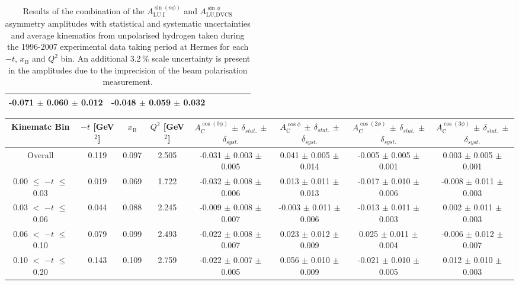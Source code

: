 \begin{table}[width=15cm]
\begin{center}
{\begin{tabular}{|c|c|c|c|c|c|c|}
-0.071  $\pm$  0.060 $\pm$ 0.012 & -0.048  $\pm$  0.059  $\pm$  0.032\\
\hline
  \end{tabular}
}
 \end{center}
\caption{Results of the combination of the $A_{\textrm{LU,I}}^{\sin(n\phi)}$ and $A_{\textrm{LU,DVCS}}^{\sin \phi}$ asymmetry amplitudes with statistical and systematic uncertainties and average kinematics from unpolarised hydrogen taken during
the 1996-2007 experimental data taking period at H{\sc ermes} for each $-t$, $x_{\textrm{B}}$ and $Q^{2}$ bin.
An additional 3.2\,\% scale uncertainty is present in the amplitudes due to the imprecision of
the beam polarisation measurement.
}
\end{table}


\begin{table}[width=15cm]
 \begin{center}
\resizebox{16cm}{!} {
  \begin{tabular}{|c|c|c|c|c|c|c|c|}
\hline
Kinematc Bin &  $-t$ [GeV$^{2}$] & $x_{\textrm{B}}$ & $Q^{2}$ [GeV$^{2}$] & 
$A_{\textrm{C}}^{\cos(0\phi)}$ $\pm$ $\delta_{stat.}$ $\pm$ $\delta_{syst.}$ & $A_{\textrm{C}}^{\cos\phi}$ $\pm$ $\delta_{stat.}$ $\pm$ $\delta_{syst.}$
& $A_{\textrm{C}}^{\cos(2\phi)}$ $\pm$ $\delta_{stat.}$ $\pm$ $\delta_{syst.}$ & $A_{\textrm{C}}^{\cos(3\phi)}$ $\pm$ $\delta_{stat.}$ $\pm$ $\delta_{syst.}$ \\
\hline
\hline
Overall &  0.119 & 0.097 &  2.505 &  -0.031 $\pm$  0.003 $\pm$  0.005 & 
0.041  $\pm$  0.005 $\pm$   0.014 &  -0.005  $\pm$  0.005  $\pm$   0.001 &  0.003  $\pm$   0.005   $\pm$   0.001 \\
\hline
0.00 $\leqslant$ $-t$ $\leqslant$ 0.03 &  0.019 & 0.069 & 1.722  &  -0.032  $\pm$  0.008 $\pm$ 0.006 & 
0.013  $\pm$  0.011  $\pm$   0.013 &  -0.017  $\pm$  0.010 $\pm$  0.006 &  -0.008   $\pm$  0.011   $\pm$   0.003\\
0.03 $<$ $-t$ $\leqslant$ 0.06 &  0.044 & 0.088 & 2.245 & -0.009  $\pm$  0.008  $\pm$   0.007 &
 -0.003 $\pm$  0.011  $\pm$   0.006 &  -0.013  $\pm$  0.011  $\pm$  0.003 &  0.002   $\pm$  0.011   $\pm$   0.003\\
0.06 $<$ $-t$ $\leqslant$ 0.10 & 0.079  & 0.099 &  2.493 & -0.022  $\pm$  0.008  $\pm$  0.007 & 
0.023 $\pm$  0.012  $\pm$   0.009 & 0.025  $\pm$  0.011 $\pm$   0.004 &  -0.006   $\pm$  0.012  $\pm$    0.007\\
0.10 $<$ $-t$ $\leqslant$ 0.20 & 0.143  & 0.109 &  2.759 &  -0.022  $\pm$  0.007   $\pm$  0.005 & 
0.056 $\pm$  0.010  $\pm$   0.009 &  -0.021  $\pm$  0.010  $\pm$  0.005 & 0.012   $\pm$  0.010    $\pm$  0.003\\

\end{tabular}}
\end{center}
\end{table}
